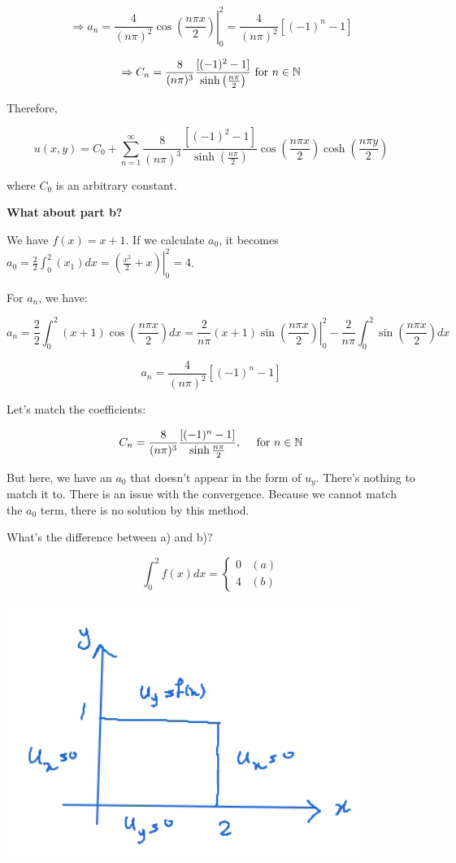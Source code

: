 \documentclass{article}
\begin{document}

$$\Rightarrow a_n = \left. \frac{4}{(n \pi)^2} \cos \left( \frac{n \pi x}{2} \right) \right|_0^2 = \frac{4}{(n \pi)^2} [(-1)^n - 1]$$

$$\Rightarrow C_n = \frac{8}{(n \pi)^3} \frac{ [(-1)^2 - 1]}{\sinh \left( \frac{n \pi}{2} \right)} \text{ for } n \in \mathbb{N}$$

Therefore,

$$u(x,y) = C_0 + \sum_{n=1}^\infty \frac{8}{(n \pi)^3} \frac{ [(-1)^2 - 1]}{\sinh \left( \frac{n \pi}{2} \right)}  \cos \left( \frac{n \pi x}{2} \right) \cosh \left( \frac{n \pi y}{2} \right)$$

where $C_0$ is an arbitrary constant. 

\textbf{What about part b?}

We have $f(x) = x+1$. If we calculate $a_0$, it becomes $a_0 = \frac{2}{2} \int_0^2 (x_1) dx = \left. \left( \frac{x^2}{2} + x \right) \right|_0^2 = 4$. 

For $a_n$, we have:

$$a_n = \frac{2}{2} \int_0^2 (x+1) \cos \left( \frac{n \pi x}{2} \right) dx = \frac{2}{n \pi} (x+1) \left. \sin \left( \frac{n \pi x}{2} \right) \right|_0^2 - \frac{2}{n \pi} \int_0^2 \sin \left( \frac{n \pi x}{2} \right) dx$$

$$a_n = \frac{4}{(n \pi)^2} \left[ (-1)^n - 1 \right]$$

Let's match the coefficients:

$$C_n = \frac{8}{(n \pi)^3} \frac{ \left[ (-1)^n - 1 \right] }{\sinh \frac{n \pi}{2}}, \quad \text{ for } n \in \mathbb{N}$$

But here, we have an $a_0$ that doesn't appear in the form of $u_y$. There's nothing to match it to. There is an issue with the convergence. Because we cannot match the $a_0$ term, there is no solution by this method. 

What's the difference between a) and b)?

$$\int_0^2 f(x) dx = \left\{ \begin{matrix} 0 & (a) \\ 4 & (b) \end{matrix} \right.$$

\begin{center}
    \includegraphics[width = 0.6 \textwidth]{5.png}
\end{center}
\end{document}
